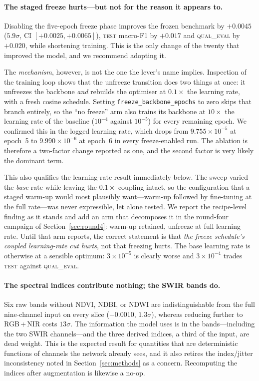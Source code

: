 \documentclass[11pt,a4paper]{article}
\begin{document}
\paragraph{The staged freeze hurts---but not for the reason it appears to.}
Disabling the five-epoch freeze phase improves the frozen benchmark by $+0.0045$
($5.9\sigma$, CI $[+0.0025, +0.0065]$), \textsc{test} macro-F1 by $+0.017$ and
\textsc{qual\_eval} by $+0.020$, while shortening training. This is the only
change of the twenty that improved the model, and we recommend adopting it.

The \emph{mechanism}, however, is not the one the lever's name implies. Inspection
of the training loop shows that the unfreeze transition does two things at once:
it unfreezes the backbone \emph{and} rebuilds the optimiser at
$0.1\times$ the learning rate, with a fresh cosine schedule. Setting
\texttt{freeze\_backbone\_epochs} to zero skips that branch entirely, so the
``no freeze'' arm also trains its backbone at $10\times$ the learning rate
of the baseline ($10^{-4}$ against $10^{-5}$) for every remaining epoch. We
confirmed this in the logged learning rate, which drops from
$9.755\times10^{-5}$ at epoch~5 to $9.990\times10^{-6}$ at epoch~6 in every
freeze-enabled run. The ablation is therefore a two-factor change reported as
one, and the second factor is very likely the dominant term.

This also qualifies the learning-rate result immediately below. The sweep varied
the \emph{base} rate while leaving the $0.1\times$ coupling intact, so the
configuration that a staged warm-up would most plausibly want---warm-up followed
by fine-tuning at the full rate---was never expressible, let alone tested. We
report the recipe-level finding as it stands and add an arm that decomposes it
in the round-four campaign of Section~\ref{sec:round4}: warm-up retained,
unfreeze at full learning rate. Until that arm reports, the correct statement is
that \emph{the freeze schedule's coupled learning-rate cut hurts}, not that
freezing hurts. The base learning rate is otherwise at a sensible optimum:
$3\times10^{-5}$ is clearly worse and $3\times10^{-4}$ trades \textsc{test}
against \textsc{qual\_eval}.

\paragraph{The spectral indices contribute nothing; the SWIR bands do.} Six raw
bands without NDVI, NDBI, or NDWI are indistinguishable from the full
nine-channel input on every slice ($-0.0010$, $1.3\sigma$), whereas reducing
further to RGB\,+\,NIR costs $13\sigma$. The information the model uses is in the
bands---including the two SWIR channels---and the three derived indices, a third
of the input, are dead weight. This is the expected result for quantities that
are deterministic functions of channels the network already sees, and it also
retires the index/jitter inconsistency noted in Section~\ref{sec:methods} as a
concern. Recomputing the indices after augmentation is likewise a no-op.
\end{document}
